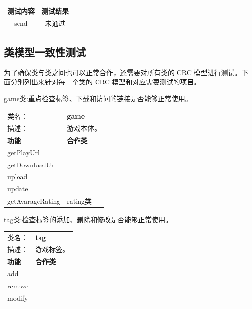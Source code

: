\documentclass[12pt]{ctexart} %
\begin{document}
\begin{table}[H]
  \centering  %
  \begin{tabular}{|c|c|}
    \hline
    测试内容 & 测试结果 \\
    \hline
    send & 未通过 \\
    \hline
  \end{tabular}
\end{table}

\subsection{类模型一致性测试}
为了确保类与类之间也可以正常合作，还需要对所有类的 CRC 模型进行测试。下面分别列出来针对每一个类的 CRC 模型和对应需要测试的项目。

game类:重点检查标签、下载和访问的链接是否能够正常使用。
\begin{table}[H]
  \centering
  \begin{tabular}{|ll|}  %
    \cline{1-2}  %
    类名：& \textbf{game} \\
    \cline{1-2}
    描述：& 游戏本体。 \\
    \cline{1-2}
    \multicolumn{1}{|l|}{\textbf{功能}} &{\textbf{合作类}} \\  %
    \hline
    \multicolumn{1}{|l|}{getPlayUrl} &  \\
    \hline
    \multicolumn{1}{|l|}{getDownloadUrl} &  \\
    \hline
    \multicolumn{1}{|l|}{upload} &  \\
    \hline
    \multicolumn{1}{|l|}{update} &  \\
    \hline
    \multicolumn{1}{|l|}{getAvarageRating} & rating类 \\
    \hline
  \end{tabular}
\end{table}

tag类:检查标签的添加、删除和修改是否能够正常使用。
\begin{table}[H]
  \centering
  \begin{tabular}{|ll|}  %
    \cline{1-2}  %
    类名：& \textbf{tag} \\
    \cline{1-2}
    描述：& 游戏标签。 \\
    \cline{1-2}
    \multicolumn{1}{|l|}{\textbf{功能}} & {\textbf{合作类}} \\  %
    \hline
    \multicolumn{1}{|l|}{add} &  \\
    \hline
    \multicolumn{1}{|l|}{remove} &  \\
    \hline
    \multicolumn{1}{|l|}{modify} &  \\
    \hline
  \end{tabular}
\end{table}
\end{document}
